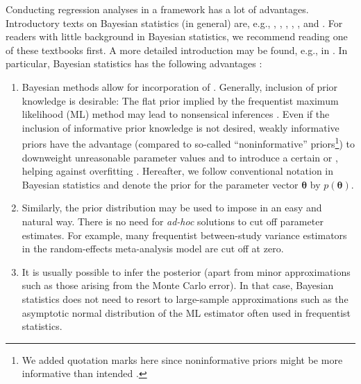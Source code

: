 Conducting regression analyses in a  framework has a lot of
advantages. Introductory texts on Bayesian statistics (in general) are,
e.g., \citet{mcelreath_statistical_2020}, \citet{albert_probability_2019},
\citet{reich_bayesian_2019}, \citet{statacorp_introduction_2019},
\citet{gelman_regression_2020}, and \citet{johnson_bayes_2022}.
For readers with little background in Bayesian statistics, we recommend
reading one of these textbooks first. A more detailed introduction
may be found, e.g., in \citet{gelman_bayesian_2014}. In particular, Bayesian
statistics has the following advantages \citep[for further advantages, see,
e.g.,][]{gelman_bayesian_2014, statacorp_introduction_2019}:
\begin{enumerate}
  \item Bayesian methods allow for incorporation of .
  Generally, inclusion of prior knowledge is desirable: The flat prior implied
  by the frequentist maximum likelihood (ML) method may lead to nonsensical
  inferences \citep{gelman_prior_2017}. Even if the inclusion of informative
  prior knowledge is not desired, weakly informative priors have the advantage
  (compared to so-called ``noninformative'' priors\footnote{We added quotation
  marks here since noninformative priors might be more informative than intended
  \citep{gelman_prior_2017}.}) to downweight unreasonable parameter values and to
  introduce a certain  or , helping against
  overfitting \citep{gelman_prior_2006, gelman_weakly_2008, gelman_bayesian_2014,
  gelman_prior_2017}. Hereafter, we follow conventional notation in Bayesian
  statistics and denote the prior for the parameter vector $\boldsymbol{\theta}$
  by $p(\boldsymbol{\theta})$.

  \item Similarly, the prior distribution may be used to impose  in an easy and natural way. There is no need for \textit{ad-hoc}
  solutions to cut off parameter estimates. For example, many frequentist
  between-study variance estimators in the random-effects meta-analysis model
  are cut off at zero.

  \item It is usually possible to infer the posterior  (apart from
  minor approximations such as those arising from the Monte Carlo error). In
  that case, Bayesian statistics does not need to resort to large-sample
  approximations such as the asymptotic normal distribution of the ML estimator
  often used in frequentist statistics.
  

\end{enumerate}

